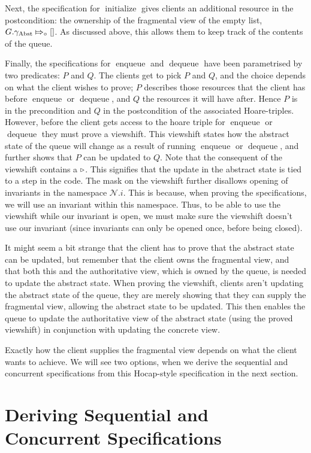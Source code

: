 \documentclass[a4paper, 10pt]{report}
\theoremstyle{definition}
\newcommand{\initialise}{\operatorname{initialize}}
\newcommand{\enqueue}{\operatorname{enqueue}}
\newcommand{\dequeue}{\operatorname{dequeue}}
\newcommand{\Qg}{G}
\newcommand{\gabst}{\gname_{\mathrm{Abst}}}
\newcommand{\Nl}{\ensuremath{\mathcal{N}}}
\newcommand{\abstractstatefullfrag}[2]{#1 \Mapsto_{\circ} #2}
\begin{document}
Next, the specification for $\initialise$ gives clients an additional resource in the postcondition: the ownership of the fragmental view of the empty list, $\abstractstatefullfrag{\Qg.\gabst}{[]}$. As discussed above, this allows them to keep track of the contents of the queue.

Finally, the specifications for $\enqueue$ and $\dequeue$ have been parametrised by two predicates: $P$ and $Q$. The clients get to pick $P$ and $Q$, and the choice depends on what the client wishes to prove; $P$ describes those resources that the client has before $\enqueue$ or $\dequeue$, and $Q$ the resources it will have after. Hence $P$ is in the precondition and $Q$ in the postcondition of the associated Hoare-triples. However, before the client gets access to the hoare triple for $\enqueue$ or $\dequeue$ they must prove a viewshift. This viewshift states how the abstract state of the queue will change as a result of running $\enqueue$ or $\dequeue$, and further shows that $P$ can be updated to $Q$. Note that the consequent of the viewshift contains a $\mathop{\triangleright}$. This signifies that the update in the abstract state is tied to a step in the code. The mask on the viewshift further disallows opening of invariants in the namespace $\Nl.i$. This is because, when proving the specifications, we will use an invariant within this namespace. Thus, to be able to use the viewshift while our invariant is open, we must make sure the viewshift doesn't use our invariant (since invariants can only be opened once, before being closed).

It might seem a bit strange that the client has to prove that the abstract state can be updated, but remember that the client owns the fragmental view, and that both this and the authoritative view, which is owned by the queue, is needed to update the abstract state. When proving the viewshift, clients aren't updating the abstract state of the queue, they are merely showing that they can supply the fragmental view, allowing the abstract state to be updated. This then enables the queue to update the authoritative view of the abstract state (using the proved viewshift) in conjunction with updating the concrete view.

Exactly how the client supplies the fragmental view depends on what the client wants to achieve. We will see two options, when we derive the sequential and concurrent specifications from this Hocap-style specification in the next section.


\section{Deriving Sequential and Concurrent Specifications}
\label{QueueSpecs:section:deriving-seq-and-conc}
\end{document}
